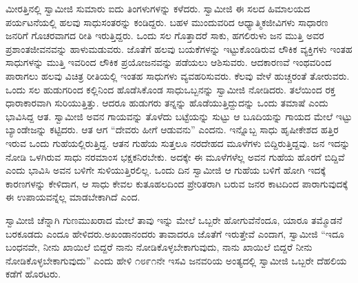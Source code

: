 ಮೀರತ್ತಿನಲ್ಲಿ ಸ್ವಾಮೀಜಿ ಸುಮಾರು ಐದು ತಿಂಗಳುಗಳನ್ನು ಕಳೆದರು. ಸ್ವಾಮೀಜಿ ಈ ಸಲದ ಹಿಮಾಲಯದ ಪರ್ಯಟನೆಯಲ್ಲಿ ಹಲವು ಸಾಧುಸಂತರನ್ನು ಕಂಡಿದ್ದರು. ಬಹಳ ಮುಂದುವರಿದ ಆಧ್ಯಾತ್ಮಿಕಜೀವಿಗಳು ಸಾಧಾರಣ ಜನರಿಗೆ ಗೊಚರವಾಗದ ರೀತಿ ಇರುತ್ತಿದ್ದರು. ಒಂದು ಸಲ ಗೊತ್ತಾದರೆ ಸಾಕು, ಹಗಲಿರುಳು ಜನ ಮುತ್ತಿ ಅವರ ಪ್ರಶಾಂತಜೀವನವನ್ನು ಹಾಳುಮಡುವರು. ಜೊತೆಗೆ ಹಲವು ಬಯಕೆಗಳನ್ನು ಇಟ್ಟುಕೊಂಡಿರುವ ಲೌಕಿಕ ವ್ಯಕ್ತಿಗಳು ಇಂತಹ ಸಾಧುಗಳನ್ನು ಮುತ್ತಿ ಇವರಿಂದ ಲೌಕಿಕ ಪ್ರಯೋಜನವನ್ನು ಪಡೆಯಲು ಆಶಿಸುವರು. ಆದಕಾರಣವೆ ಇಂಥವರಿಂದ ಪಾರಾಗಲು ಹಲವು ವಿಚಿತ್ರ ರೀತಿಯಲ್ಲಿ ಇಂತಹ ಸಾಧುಗಳು ವ್ಯವಹರಿಸುವರು. ಕೆಲವು ವೇಳೆ ಹುಚ್ಚರಂತೆ ತೋರುವರು. ಒಂದು ಸಲ ಹುಡುಗರಿಂದ ಕಲ್ಲಿನಿಂದ ಹೊಡೆಸಿಕೊಂಡ ಸಾಧು\break ಒಬ್ಬನನ್ನು ಸ್ವಾಮೀಜಿ ನೋಡಿದರು. ತಲೆಯಿಂದ ರಕ್ತ ಧಾರಾಕಾರವಾಗಿ ಸುರಿಯುತ್ತಿತ್ತು. ಆದರೂ ಹುಡುಗರು ತನ್ನನ್ನು ಹೊಡೆಯುತ್ತಿದ್ದುದನ್ನು ಒಂದು ತಮಾಷೆ ಎಂದು ಭಾವಿಸಿದ್ದ ಆತ. ಸ್ವಾಮೀಜಿ ಅವನ ಗಾಯವನ್ನು ತೊಳೆದು ಬಟ್ಟೆಯನ್ನು ಸುಟ್ಟು ಆ ಬೂದಿಯನ್ನು ಗಾಯದ ಮೇಲೆ ಇಟ್ಟು ಬ್ಯಾಂಡೇಜನ್ನು ಕಟ್ಟಿದರು. ಆತ ಆಗ “ದೇವರು ಹೀಗೆ ಆಡುವನು” ಎಂದನು. ಇನ್ನೊಬ್ಬ ಸಾಧು ಹೃಷೀಕೇಶದ ಹತ್ತಿರ ಇರುವ ಒಂದು ಗುಹೆಯಲ್ಲಿರುತ್ತಿದ್ದ. ಆತನ ಗುಹೆಯ ಸುತ್ತಲೂ ನರದೇಹದ ಮೂಳೆಗಳು ಬಿದ್ದಿರುತ್ತಿದ್ದವು. ಜನ ಇದನ್ನು ನೋಡಿ ಒಳಗಿರುವ ಸಾಧು ನರಮಾಂಸ ಭಕ್ಷಕನಿರಬೇಕು. ಅದಕ್ಕೇ ಈ ಮೂಳೆಗಳೆಲ್ಲ ಅವನ ಗುಹೆಯ ಹೊರಗೆ ಬಿದ್ದಿವೆ ಎಂದು ಭಾವಿಸಿ ಅವನ ಬಳಿಗೇ ಸುಳಿಯುತ್ತಿರಲಿಲ್ಲ. ಒಂದು ದಿನ ಸ್ವಾಮೀಜಿ ಆ ಗುಹೆಯ ಬಳಿಗೆ ಹೋಗಿ ಇದಕ್ಕೆ ಕಾರಣಗಳನ್ನು ಕೇಳಿದಾಗ, ಆ ಸಾಧು ಕೇವಲ ಕುತೂಹಲದಿಂದ ಪ್ರೇರಿತರಾಗಿ ಬರುವ ಜನರ ಕಾಟದಿಂದ ಪಾರಾಗುವುದಕ್ಕೆ ಈ ಉಪಾಯವನ್ನೆಲ್ಲ ಮಾಡಬೇಕಾಗಿದೆ ಎಂದ. 

ಸ್ವಾಮೀಜಿ ಚೆನ್ನಾಗಿ ಗುಣಮುಖರಾದ ಮೇಲೆ ತಾವು ಇನ್ನು ಮೇಲೆ ಒಬ್ಬರೇ ಹೋಗುವೆನೆಂದೂ, ಯಾರೂ ತಮ್ಮೊಡನೆ ಬರಕೂಡದು ಎಂದೂ ಹೇಳಿದರು.\break ಅಖಂಡಾನಂದರು ತಾವಾದರೂ ಜೊತೆಗೆ ಇರುತ್ತೇವೆ ಎಂದಾಗ, ಸ್ವಾಮೀಜಿ “ಇದೂ ಬಂಧನವೇ, ನೀನು ಖಾಯಿಲೆ ಬಿದ್ದರೆ ನಾನು ನೋಡಿಕೊಳ್ಳಬೇಕಾಗುವುದು, ನಾನು ಖಾಯಿಲೆ ಬಿದ್ದರೆ ನೀನು ನೋಡಿಕೊಳ್ಳಬೇಕಾಗುವುದು” ಎಂದು ಹೇಳಿ ೧೮೯೧ನೇ ಇಸವಿ ಜನವರಿಯ ಅಂತ್ಯದಲ್ಲಿ ಸ್ವಾಮೀಜಿ ಒಬ್ಬರೇ ದೆಹಲಿಯ ಕಡೆಗೆ ಹೊರಟರು. 

